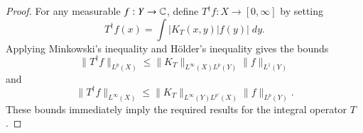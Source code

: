 \begin{proof}
    For any measurable $f: Y \to \operatorname{\mathbb{C}}$, define $T^\dagger f: X \to [0,\infty]$ by setting
    \begin{equation}
        T^\dagger f(x) = \int |K_T(x,y)| f(y)|\; dy.
    \end{equation}
    Applying Minkowski's inequality and H\"{o}lder's inequality gives the bounds
    \begin{equation}
        \| T^\dagger f \|_{L^p(X)} \leq \| K_T \|_{L^\infty(X) L^p(Y)} \| f \|_{L^1(Y)}
    \end{equation}
    and
    \begin{equation}
        \| T^\dagger f \|_{L^\infty(X)} \leq \| K_T \|_{L^\infty(Y) L^{p'}(X)} \| f \|_{L^p(Y)}.
    \end{equation}
    These bounds immediately imply the required results for the integral operator $T$.
\begin{comment}
    If $K_T \in L^\infty(Y) L^p(X)$, then for any measurable function $f$ on $Y$, the integral
    \begin{equation} \label{equation189203u190248231094583129}
        \left( \int \left( \int |K_T(x,y)| |f(y)|\; dy \right)^p\; dx \right)^{1/p}
    \end{equation}
    is well defined, though possibly infinite. Applying Minkowski's inequality, we find that
    \begin{equation} \label{equatyion12890u3091284587u93125tuy98324hfv9i8euwhf}
    \begin{split}
        \left( \int \left( \int |K_T(x,y)| |f(y)|\; dy \right)^p\; dx \right)^{1/p} &\leq \int \left( \int |K_T(x,y)|^p |f(y)|^p\; dx \right)^{1/p}\; dy\\
        &\leq \int \| K_T \|_{L^p(X)} |f(y)|\; dy\\
        &\leq \| K_T \|_{L^\infty(X) L^p(Y)} \| f \|_{L^1(Y)}.
    \end{split}
    \end{equation}
    Thus if $f \in L^1(Y)$, \eqref{equation189203u190248231094583129} is finite, and so $\int |K_T(x,y)| |f(y)|\; dy$ is finite for almost every $x \in X$, so that $Tf$ is well defined as a measurable function on $X$. But the triangle inequality and \eqref{equatyion12890u3091284587u93125tuy98324hfv9i8euwhf} imply the bound $\| Tf \|_{L^\infty(X)} \leq \| K_T \|_{L^\infty(X) L^p(Y)} \| f \|_{L^1(Y)}$.
\end{comment}
\end{proof}

